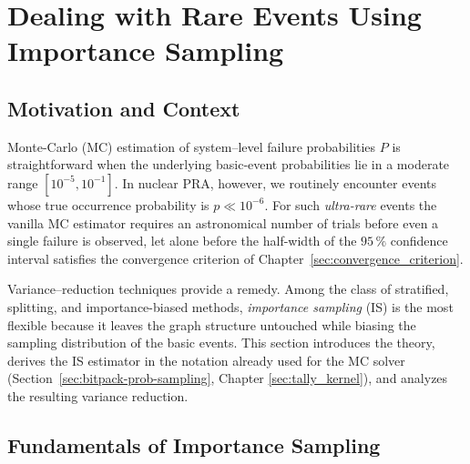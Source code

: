 \chapter{Dealing with Rare Events Using Importance Sampling}
\label{chap:is}

\section{Motivation and Context}

Monte-Carlo (MC) estimation of system–level failure probabilities \(P\) is
straightforward when the underlying basic‐event probabilities lie in a
moderate range \([10^{-5},10^{-1}]\).  In nuclear PRA, however, we routinely
encounter events whose true occurrence probability is \(p\ll10^{-6}\).  For
such \emph{ultra-rare} events the vanilla MC estimator requires an
astronomical number of trials before even a single failure is observed, let
alone before the half-width of the \(95\,\%\) confidence interval satisfies the
convergence criterion of Chapter~\ref{sec:convergence_criterion}.  

Variance–reduction techniques provide a remedy.  Among the class of
stratified, splitting, and importance-biased methods, \emph{importance
sampling} (IS) is the most flexible because it leaves the graph structure
untouched while biasing the sampling distribution of the basic events.  This
section introduces the theory, derives the IS estimator in the notation
already used for the MC solver
(Section~\ref{sec:bitpack-prob-sampling}, Chapter \ref{sec:tally_kernel}), and analyzes the
resulting variance reduction.

\section{Fundamentals of Importance Sampling}
\label{sec:is:fundamentals}

